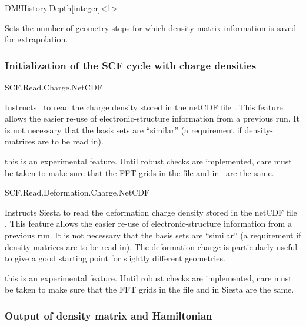 \begin{fdfentry}{DM!History.Depth}[integer]<1>

  Sets the number of geometry steps for which density-matrix information
  is saved for extrapolation.
  
\end{fdfentry}



\subsubsection{Initialization of the SCF cycle with charge densities}


\begin{fdflogicalF}{SCF.Read.Charge.NetCDF}

  Instructs \siesta\ to read the charge density stored in the netCDF
  file . This feature allows the easier re-use of
  electronic-structure information from a previous run. It is not
  necessary that the basis sets are ``similar'' (a requirement if
  density-matrices are to be read in).

  \note this is an experimental feature. Until robust checks are
  implemented, care must be taken to make sure that the FFT grids in
  the  file and in \siesta\ are the same.

\end{fdflogicalF}


\begin{fdflogicalF}{SCF.Read.Deformation.Charge.NetCDF}
  
  Instructs Siesta to read the deformation charge density stored in
  the netCDF file . This feature allows the
  easier re-use of electronic-structure information from a previous
  run. It is not necessary that the basis sets are ``similar'' (a
  requirement if density-matrices are to be read in). The deformation
  charge is particularly useful to give a good starting point for
  slightly different geometries.

  \note this is an experimental feature. Until robust checks are
  implemented, care must be taken to make sure that the FFT grids in
  the  file and in Siesta are the same.

\end{fdflogicalF}


\subsubsection{Output of density matrix and Hamiltonian}

